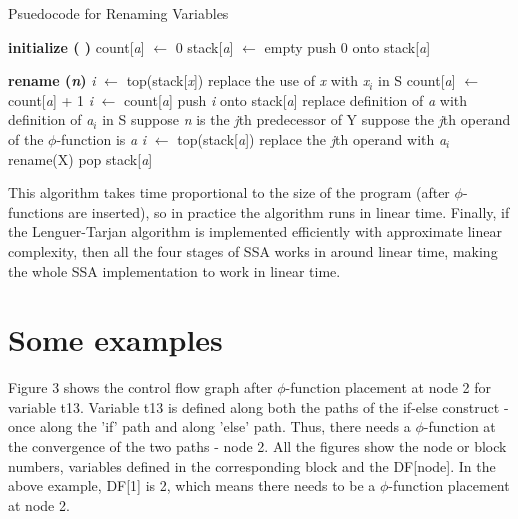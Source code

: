 \documentclass[10pt, oneside, a4paper]{article}
\begin{document}
\begin{algorithm}
\caption{Psuedocode for Renaming Variables}
\label{alg3}
\begin{algorithmic}[1]
\STATE \textbf{initialize ( )}
\STATE count[\emph{a}] $\leftarrow$ 0
\STATE stack[\emph{a}] $\leftarrow$ empty
\STATE push 0 onto stack[\emph{a}]
\ENDFOR

\STATE \textbf{rename (\emph{n})}
\STATE \emph{i} $\leftarrow$ top(stack[\emph{x}])
\STATE replace the use of \emph{x} with \emph{x$_i$} in S
\ENDFOR
\ENDIF
{}
\STATE count[\emph{a}] $\leftarrow$ count[\emph{a}] + 1
\STATE \emph{i} $\leftarrow$ count[\emph{a}]
\STATE push \emph{i} onto stack[\emph{a}]
\STATE replace definition of \emph{a} with definition of \emph{a$_i$} in S
\ENDFOR
\ENDFOR
{}
\STATE suppose \emph{n} is the \emph{j}th predecessor of Y
\STATE suppose the \emph{j}th operand of the $\phi$-function is \emph{a}
\STATE \emph{i} $\leftarrow$ top(stack[\emph{a}])
\STATE replace the \emph{j}th operand with \emph{a$_i$}
\ENDFOR
\ENDFOR
{}
\STATE rename(X)
\ENDFOR
{}
\STATE pop stack[\emph{a}]
\ENDFOR
\end{algorithmic}
\end{algorithm}

This algorithm takes time proportional to the size of the program (after $\phi$-functions are inserted), so in practice the algorithm runs in linear time.  Finally, if the Lenguer-Tarjan algorithm is implemented efficiently with approximate linear complexity, then all the four stages of SSA works in around linear time, making the whole SSA implementation to work in linear time.

\section{Some examples}
Figure 3 shows the control flow graph after $\phi$-function placement at node 2 for variable t13.  Variable t13 is defined along both the paths of the if-else construct - once along the 'if' path and along 'else' path.  Thus, there needs a $\phi$-function at the convergence of the two paths - node 2.  All the figures show the node or block numbers, variables defined in the corresponding block and the DF[node].  In the above example, DF[1] is 2, which means there needs to be a $\phi$-function placement at node 2.
\end{document}
